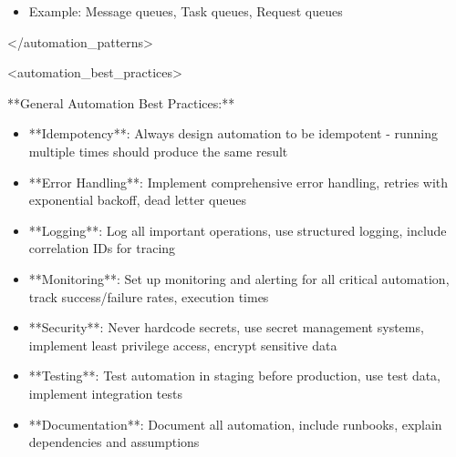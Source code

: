 \documentclass[11pt,a4paper]{article}
\begin{document}
\begin{itemize}
\item Example: Message queues, Task queues, Request queues
\end{itemize}

</automation\_patterns>

<automation\_best\_practices>

**General Automation Best Practices:**

\begin{itemize}
\item **Idempotency**: Always design automation to be idempotent - running multiple times should produce the same result
\end{itemize}

\begin{itemize}
\item **Error Handling**: Implement comprehensive error handling, retries with exponential backoff, dead letter queues
\end{itemize}

\begin{itemize}
\item **Logging**: Log all important operations, use structured logging, include correlation IDs for tracing
\end{itemize}

\begin{itemize}
\item **Monitoring**: Set up monitoring and alerting for all critical automation, track success/failure rates, execution times
\end{itemize}

\begin{itemize}
\item **Security**: Never hardcode secrets, use secret management systems, implement least privilege access, encrypt sensitive data
\end{itemize}

\begin{itemize}
\item **Testing**: Test automation in staging before production, use test data, implement integration tests
\end{itemize}

\begin{itemize}
\item **Documentation**: Document all automation, include runbooks, explain dependencies and assumptions
\end{itemize}
\end{document}
